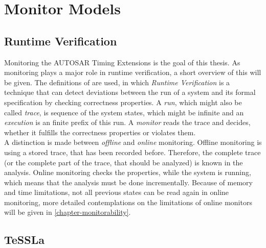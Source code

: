 
\chapter{Monitor Models}
\label{chapter-Monitor-Models}

\section{Runtime Verification}
	Monitoring the AUTOSAR Timing Extensions is the goal of this thesis. As monitoring plays a major role in runtime verification, a short overview of this will be given. The definitions of \cite{RuntimeVerification} are used, in which \emph{Runtime Verification} is a technique that can detect deviations between the run of a system and its formal specification by checking correctness properties. A \emph{run}, which might also be called \emph{trace}, is sequence of the system states, which might be infinite and an \emph{execution} is an finite prefix of this run. A \emph{monitor} reads the trace and decides, whether it fulfills the correctness properties or violates them.\\
	A distinction is made between \emph{offline} and \emph{online} monitoring. Offline monitoring is using a stored trace, that has been recorded before. Therefore, the complete trace (or the complete part of the trace, that should be analyzed) is known in the analysis. Online monitoring checks the properties, while the system is running, which means that the analysis must be done incrementally. Because of memory and time limitations, not all previous states can be read again in online monitoring, more detailed contemplations on the limitations of online monitors will be given in \ref{chapter-monitorability}.


\section{TeSSLa}

